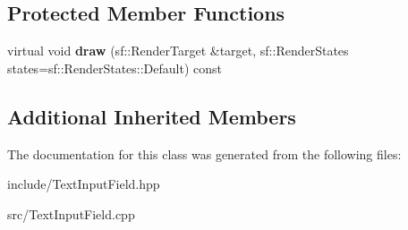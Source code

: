 \subsection*{Protected Member Functions}
\begin{DoxyCompactItemize}
\item 
\hypertarget{class_text_input_field_a6d6e2b1cfde181724d1039c0991a7483}{virtual void {\bfseries draw} (sf\-::\-Render\-Target \&target, sf\-::\-Render\-States states=sf\-::\-Render\-States\-::\-Default) const }\label{class_text_input_field_a6d6e2b1cfde181724d1039c0991a7483}

\end{DoxyCompactItemize}
\subsection*{Additional Inherited Members}


The documentation for this class was generated from the following files\-:\begin{DoxyCompactItemize}
\item 
include/Text\-Input\-Field.\-hpp\item 
src/Text\-Input\-Field.\-cpp\end{DoxyCompactItemize}
